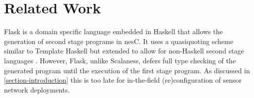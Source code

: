 
\section{Related Work}
\label{section-related-work}


%


Flask \cite{Mainland-Flask-2008} is a domain specific language embedded in Haskell that allows
the generation of second stage programs in nesC. It uses a quasiquoting scheme similar to
Template Haskell \cite{Sheard-TemplateHaskell} but extended to allow for non-Haskell second
stage languages \cite{Mainland-2007}. However, Flask, unlike Scalaness, defers full type
checking of the generated program until the execution of the first stage program. As discussed
in \autoref{section-introduction} this is too late for in-the-field (re)configuration of sensor
network deployments.

